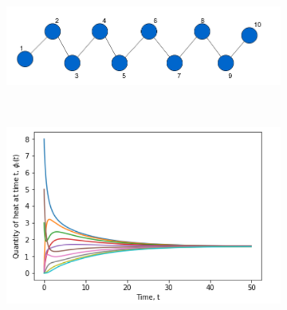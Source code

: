 \documentclass[10pt,a4paper]{article}
\begin{document}
  
\newpage
\begin{figure}[!h]
	\centering
	\begin{subfigure}[b]{0.47\textwidth}
		\includegraphics[width=\textwidth]{images/path-graph-dif.png}
		\caption{}
		\label{path-network}
	\end{subfigure}~
	\begin{subfigure}[b]{0.45\textwidth}
		\includegraphics[width= \textwidth]{images/path-network-diffusion.png}
		\caption{}
		\label{dif-path-network}
	\end{subfigure}\\
	\begin{subfigure}[b]{0.37\textwidth}

\end{subfigure}
\end{figure}
\end{document}
